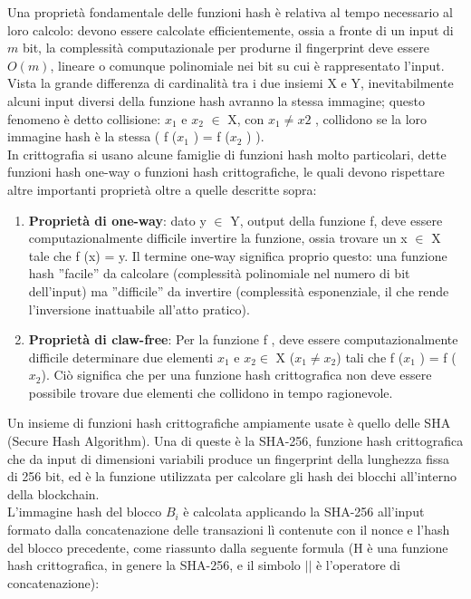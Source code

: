 Una proprietà fondamentale delle funzioni hash è relativa al tempo necessario al loro calcolo: devono essere calcolate efficientemente, ossia a fronte di un input di $m$ bit, la complessità computazionale per produrne il fingerprint deve essere $O(m)$, lineare o comunque polinomiale nei bit su cui è rappresentato l’input.\\ Vista la grande differenza di cardinalità tra i due insiemi X e Y, inevitabilmente alcuni input diversi della funzione hash avranno la stessa immagine; questo fenomeno è detto collisione: $x_1$ e $x_2$ $\in$ X, con $x_1 \neq x2$ , collidono se la loro immagine hash è la stessa ( f ($x_1$ ) = f ($x_2$ ) ).\\In crittografia si usano alcune famiglie di funzioni hash molto particolari, dette funzioni hash one-way o funzioni hash crittografiche, le quali devono rispettare altre importanti proprietà oltre a quelle descritte sopra:
\begin{enumerate}
    \item \textbf{Proprietà di one-way}: dato y $\in$ Y, output della funzione f, deve essere computazionalmente difficile invertire la funzione, ossia trovare un x $\in$ X tale che f (x) = y. Il termine one-way significa proprio questo: una funzione hash ”facile” da calcolare (complessità polinomiale nel numero di bit dell’input) ma ”difficile” da invertire (complessità esponenziale, il che rende l’inversione inattuabile all’atto pratico).
    \item \textbf{Proprietà di claw-free}: Per la funzione f , deve essere computazionalmente difficile determinare due elementi $x_1$ e $x_2 \in$ X ($x_1 \neq x_2$) tali che f ($x_1$ ) = f ($x_2$). Ciò significa che per una funzione hash crittografica non deve essere possibile trovare due elementi che collidono in tempo ragionevole.
\end{enumerate}
Un insieme di funzioni hash crittografiche ampiamente usate è quello delle SHA (Secure Hash Algorithm). Una di queste è la SHA-256, funzione hash crittografica che da input di dimensioni variabili produce un fingerprint della lunghezza fissa di 256 bit, ed è la funzione utilizzata per calcolare gli hash dei blocchi all’interno della blockchain.\\L’immagine hash del blocco $B_i$ è calcolata applicando la SHA-256 all’input formato dalla concatenazione delle transazioni lì contenute con il nonce e l’hash del blocco precedente, come riassunto dalla seguente formula (H è una funzione hash crittografica, in genere la SHA-256, e il simbolo $||$ è l’operatore di concatenazione):

